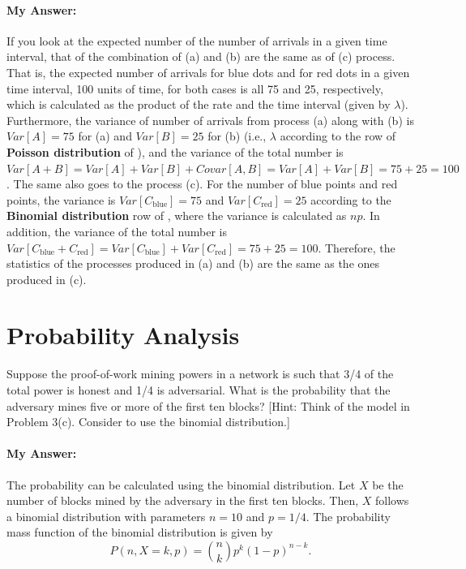\documentclass{article}
\begin{document}
\begin{enumerate}[label=(\alph*)]
    \paragraph{My Answer:} If you look at the expected number of the number of arrivals in a given time interval, that of the combination of (a) and (b) are the same as of (c) process. That is, the expected number of arrivals for blue dots and for red dots in a given time interval, 100 units of time, for both cases is all 75 and 25, respectively, which is calculated as the product of the rate and the time interval (given by $\lambda$). Furthermore, the variance of number of arrivals from process (a) along with (b) is \(Var[A] = 75\) for (a) and \(Var[B] = 25\) for (b) (i.e., $\lambda$ according to the row of \textbf{Poisson distribution} of ), and the variance of the total number is \(Var[A + B] = Var[A] + Var[B] + Covar[A, B] = Var[A] + Var[B] = 75 + 25 = 100  \). The same also goes to the process (c). For the number of blue points and red points, the variance is \(Var[C_{\text{blue}}] = 75\) and \(Var[C_{\text{red}}] = 25\) according to the \textbf{Binomial distribution} row of , where the variance is calculated as \(np\). In addition, the variance of the total number is \(Var[C_{\text{blue}} + C_{\text{red}}] = Var[C_{\text{blue}}] + Var[C_{\text{red}}] = 75 + 25 = 100\). Therefore, the statistics of the processes produced in (a) and (b) are the same as the ones produced in (c).
\end{enumerate}

\section{Probability Analysis}
Suppose the proof-of-work mining powers in a network is such that 3/4 of the total power is honest and 1/4 is adversarial.  What is the probability that the adversary mines five or more of the first ten blocks?  [Hint: Think of the model in Problem 3(c).  Consider to use the binomial distribution.]
\paragraph{My Answer:}
The probability can be calculated using the binomial distribution. Let \( X \) be the number of blocks mined by the adversary in the first ten blocks.  Then, \( X \) follows a binomial distribution with parameters \( n = 10 \) and \( p = 1/4 \). The probability mass function of the binomial distribution is given by
\begin{equation}
    P(n, X=k, p) = \binom{n}{k} p^k (1-p)^{n-k}.
\end{equation}
\end{document}
